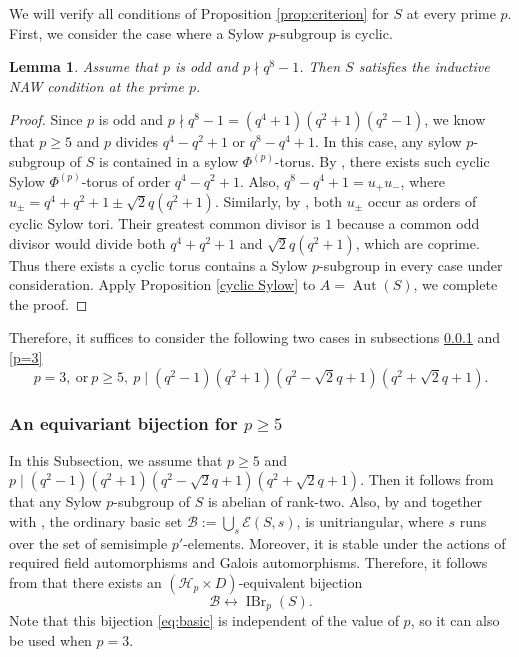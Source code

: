 \documentclass[11pt,a4paper]{article}
\numberwithin{equation}{section}
\newtheorem{lemma}[theorem]{Lemma}
\theoremstyle{definition}
\theoremstyle{remark}
\newcommand{\IBr}{\operatorname{IBr}}
\newcommand{\Aut}{\operatorname{Aut}}
\newcommand{\HH}{\mathcal H}
\begin{document}
We will verify all conditions of Proposition \ref{prop:criterion} for $S$ at every prime $p$. First, we consider the case where a Sylow $p$-subgroup is cyclic.  
\begin{lemma}\label{lem:3.2}
Assume that $p$ is odd and $p\nmid q^8-1$. Then $S$ satisfies the inductive NAW condition at the prime $p$.
\end{lemma}
\begin{proof}
Since $p$ is odd and $p\nmid q^8-1=(q^4+1)(q^2+1)(q^2-1)$, we know that $p\geq5$ and $p$ divides $q^4-q^2+1$ or $q^8-q^4+1$. In this case, any sylow $p$-subgroup of $S$ is contained in a sylow $\Phi^{(p)}$-torus. By \cite[TABLE I]{An}, there exists such cyclic Sylow $\Phi^{(p)}$-torus of order $q^4-q^2+1$. Also, $q^8-q^4+1=u_+u_-$, where $u_\pm=q^4+q^2+1\pm \sqrt{2}q(q^2+1)$. Similarly, by \cite[TABLE I]{An}, both $u_\pm$ occur as orders of cyclic Sylow tori.  Their greatest common divisor is $1$ because a common odd divisor would divide both $q^4+q^2+1$ and $\sqrt{2}q(q^2+1)$, which are coprime. Thus there exists a cyclic torus contains a Sylow $p$-subgroup in every case under consideration. Apply Proposition \ref{cyclic Sylow} to $A=\Aut(S)$, we complete the proof. 
\end{proof}
Therefore, it suffices to consider the following two cases in subsections \ref{p>=5} and \ref{p=3} 
\begin{equation}\label{eq:remaining}
 p=3,\ \text{or}\ p\geq5,\ p\mid(q^2-1)(q^2+1)(q^2-\sqrt{2}q+1)(q^2+\sqrt{2}q+1).
\end{equation}

\subsubsection{An equivariant bijection for \texorpdfstring{$p\geq5$}{p >= 5}}\label{p>=5}
In this Subsection, we assume that  $p\geq5$ and $p\mid(q^2-1)(q^2+1)(q^2-\sqrt{2}q+1)(q^2+\sqrt{2}q+1)$.
Then it follows from \cite{Johansson} that any Sylow $p$-subgroup  of $S$ is abelian of rank-two.  Also, by \cite[Corollary~4.3 and the decomposition tables in Appendix A]{Himstedt} and together with \cite{GH}, the ordinary basic set $\mathcal{B}:=\bigcup_{s}\mathcal{E}(S,s)$,
is unitriangular, where $s$ runs over the set of semisimple $p'$-elements. Moreover, it is stable under the actions of
required field automorphisms and Galois automorphisms. Therefore, it follows from \cite[Lemma~10.7]{FFZ} that there exists  an $(\HH_p\times D)$-equivalent bijection 
\begin{equation}\label{eq:basic}
\mathcal{B}\longleftrightarrow\IBr_p(S).
\end{equation}
Note that this bijection \eqref{eq:basic} is independent of the value of $p$, so it can also be used when $p=3$.
\end{document}
